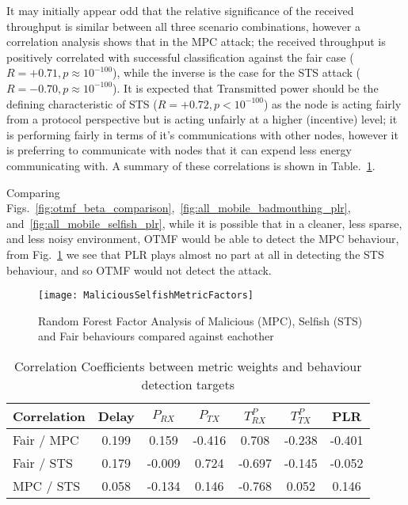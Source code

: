 It may initially appear odd that the relative significance of the received throughput is similar between all three scenario combinations, however a correlation analysis shows that in the MPC attack; the received throughput is positively correlated with successful classification against the fair case ($R=+0.71, p\approx10^{-100}$), while the inverse is the case for the STS attack ($R=-0.70, p\approx10^{-100}$).
It is expected that Transmitted power should be the defining characteristic of STS ($R=+0.72, p<10^{-100}$) as the node is acting fairly from a protocol perspective but is acting unfairly at a higher (incentive) level; it is performing fairly in terms of it's communications with other nodes, however it is preferring to communicate with nodes that it can expend less energy communicating with.
A summary of these correlations is shown in Table.~\ref{tab:correlations}.

Comparing Figs.~\ref{fig:otmf_beta_comparison},~\ref{fig:all_mobile_badmouthing_plr}, and~\ref{fig:all_mobile_selfish_plr}, while it is possible that in a cleaner, less sparse, and less noisy environment, OTMF would be able to detect the MPC behaviour, from Fig.~\ref{fig:malselfactors} we see that PLR plays almost no part at all in detecting the STS behaviour, and so OTMF would not detect the attack.

\begin{figure}
	\centering
	\texttt{[image: MaliciousSelfishMetricFactors]}
	\caption{Random Forest Factor Analysis of Malicious (MPC), Selfish (STS) and Fair behaviours compared against eachother}
	\label{fig:malselfactors}
\end{figure}

\begin{table}[h]
	\caption{Correlation Coefficients between metric weights and behaviour detection targets} \label{tab:correlations}
	\begin{center}
		\begin{tabular}{lcccccc}
			\toprule
			Correlation      & Delay & $P_{RX}$ & $P_{TX}$ & $T^P_{RX}$ & $T^P_{TX}$ & PLR \\
			\midrule
			Fair / MPC       & 0.199 &  0.159   & -0.416  &  0.708   & -0.238   & -0.401\\
			Fair / STS       & 0.179 &  -0.009  &  0.724  & -0.697   & -0.145   & -0.052\\
			MPC / STS        & 0.058 &  -0.134  &  0.146  & -0.768   &  0.052   &  0.146\\
			\bottomrule
		\end{tabular}
	\end{center}
\end{table}

